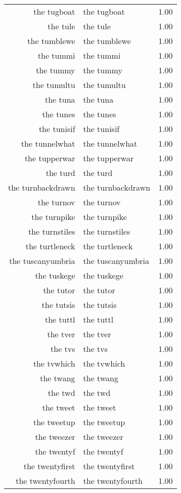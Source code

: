 \begin{table}[ht]
\begin{tabular}{rlr}
  the tugboat & the tugboat & 1.00 \\ 
  the tule & the tule & 1.00 \\ 
  the tumblewe & the tumblewe & 1.00 \\ 
  the tummi & the tummi & 1.00 \\ 
  the tummy & the tummy & 1.00 \\ 
  the tumultu & the tumultu & 1.00 \\ 
  the tuna & the tuna & 1.00 \\ 
  the tunes & the tunes & 1.00 \\ 
  the tunisif & the tunisif & 1.00 \\ 
  the tunnelwhat & the tunnelwhat & 1.00 \\ 
  the tupperwar & the tupperwar & 1.00 \\ 
  the turd & the turd & 1.00 \\ 
  the turnbackdrawn & the turnbackdrawn & 1.00 \\ 
  the turnov & the turnov & 1.00 \\ 
  the turnpike & the turnpike & 1.00 \\ 
  the turnstiles & the turnstiles & 1.00 \\ 
  the turtleneck & the turtleneck & 1.00 \\ 
  the tuscanyumbria & the tuscanyumbria & 1.00 \\ 
  the tuskege & the tuskege & 1.00 \\ 
  the tutor & the tutor & 1.00 \\ 
  the tutsis & the tutsis & 1.00 \\ 
  the tuttl & the tuttl & 1.00 \\ 
  the tver & the tver & 1.00 \\ 
  the tvs & the tvs & 1.00 \\ 
  the tvwhich & the tvwhich & 1.00 \\ 
  the twang & the twang & 1.00 \\ 
  the twd & the twd & 1.00 \\ 
  the tweet & the tweet & 1.00 \\ 
  the tweetup & the tweetup & 1.00 \\ 
  the tweezer & the tweezer & 1.00 \\ 
  the twentyf & the twentyf & 1.00 \\ 
  the twentyfirst & the twentyfirst & 1.00 \\ 
  the twentyfourth & the twentyfourth & 1.00 \\ 

\end{tabular}
\end{table}
